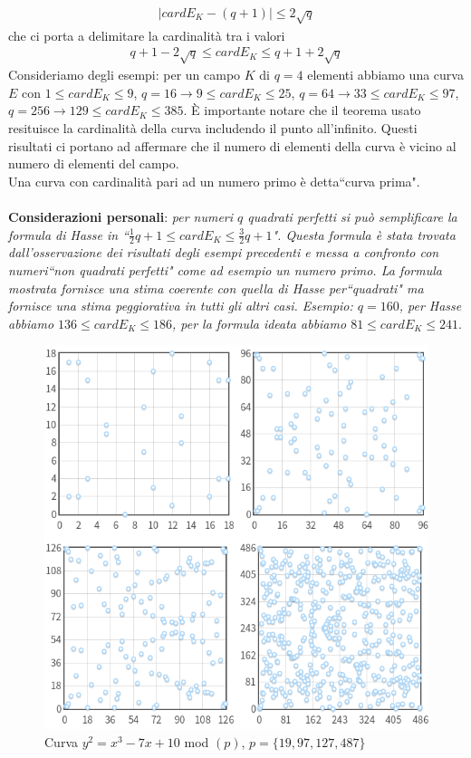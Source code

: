 \documentclass[a4paper,12pt]{tesiinfo}
\newcommand\ddfrac[2]{\frac{\displaystyle #1}{\displaystyle #2}}
\begin{document}
\begin{align*}
  \mid cardE_K - (q+1) \mid \le 2 \sqrt{q}
\end{align*}
che ci porta a delimitare la cardinalit\`a tra i valori 
\begin{align*}
  q+1-2 \sqrt {q} \le cardE_K \le q+1+2 \sqrt {q}
\end{align*}
Consideriamo degli esempi: per un campo $K$ di $q=4$ elementi abbiamo una curva $E$ con $1 \le cardE_K \le 9$, $q=16 \to 9 \le cardE_K \le 25$, $q=64 \to 33 \le cardE_K \le 97$, $q=256 \to 129 \le cardE_K \le 385$. \`E importante notare che il teorema usato resituisce la cardinalit\`a della curva includendo il punto all'infinito.
Questi risultati ci portano ad affermare che il numero di elementi della curva \`e vicino al numero di elementi del campo. 
\\
Una curva con cardinalit\`a pari ad un numero primo \`e detta``curva prima".
\\
\\
\textbf{Considerazioni personali}: \textit{per numeri $q$ quadrati perfetti si pu\`o semplificare la formula di Hasse in ``$ \ddfrac{1}{2}q +1 \le cardE_K \le \ddfrac{3}{2}q +1$". Questa formula \`e stata trovata dall'osservazione dei risultati degli esempi precedenti e messa a confronto con numeri``non quadrati perfetti" come ad esempio un numero primo. La formula mostrata fornisce una stima coerente con quella di Hasse per``quadrati" ma fornisce una stima peggiorativa in tutti gli altri casi. Esempio: $q=160$, per Hasse abbiamo $136 \le cardE_K \le 186$, per la formula ideata abbiamo $81 \le cardE_K \le 241$}. 
\begin{figure}[H]
  \includegraphics[width=.8\textwidth,center]{ECmod(p)}
  \caption{Curva $y^2 = x^3-7x+10$ mod $(p)$, $p = \{19, 97, 127, 487\}$}
\end{figure}
\end{document}
